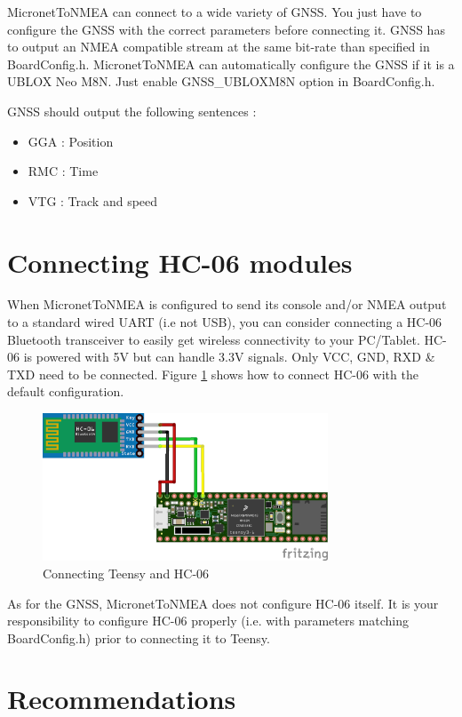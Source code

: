 \documentclass{report}
\begin{document}
MicronetToNMEA can connect to a wide variety of GNSS. You just have to configure the GNSS with the correct parameters before connecting it. GNSS has to output an NMEA compatible stream at the same bit-rate than specified in BoardConfig.h. MicronetToNMEA can automatically configure the GNSS if it is a UBLOX Neo M8N. Just enable GNSS\_UBLOXM8N option in BoardConfig.h.

GNSS should output the following sentences :
\begin{itemize}
	\item GGA : Position
	\item RMC : Time
	\item VTG : Track and speed
\end{itemize}

\section{Connecting HC-06 modules}

When MicronetToNMEA is configured to send its console and/or NMEA output to a standard wired UART (i.e not USB), you can consider connecting a HC-06 Bluetooth transceiver to easily get wireless connectivity to your PC/Tablet. HC-06 is powered with 5V but can handle 3.3V signals. Only VCC, GND, RXD \& TXD need to be connected. Figure \ref{figure:hc06} shows how to connect HC-06 with the default configuration.

\begin{figure}[h]
	\centering
	\includegraphics[width=85mm]{MicronetToNMEA_HC06.png}
	\caption{Connecting Teensy and HC-06}
	\label{figure:hc06}
\end{figure}

As for the GNSS, MicronetToNMEA does not configure HC-06 itself. It is your responsibility to configure HC-06 properly (i.e. with parameters matching BoardConfig.h) prior to connecting it to Teensy.

\section{Recommendations}
\end{document}

